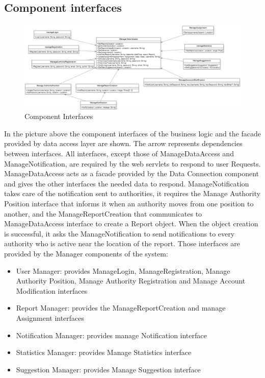 \subsection{Component interfaces}
\begin{figure}[H]
\centering
\includegraphics[width=\textwidth]{Images/Interfaces.png}
\caption{\label{fig:ComWI}Component Interfaces}
\end{figure}
In the picture above the component interfaces of the business logic and the facade provided by data access layer are shown. The arrow represents dependencies between interfaces. All interfaces, except those of ManageDataAccess and ManageNotification, are required by the web servlets to respond to user Requests. ManageDataAccess acts as a facade provided by the Data Connection component and gives the other interfaces the needed data to respond. ManageNotification takes care of the notification sent to authorities, it requires the Manage Authority Position interface that informs it when an authority moves from one position to another, and the ManageReportCreation that communicates to ManageDataAccess interface to create a Report object. When the object creation is successful, it asks the ManageNotification to send notifications to every authority who is active near the location of the report. Those interfaces are provided by the Manager components of the system:
\begin{itemize}
\item User Manager: provides ManageLogin, ManageRegistration, Manage Authority Position, Manage
Authority Registration and Manage Account Modification interfaces
\item Report Manager: provides the ManageReportCreation and manage Assignment interfaces
\item Notification Manager: provides manage Notification interface
\item Statistics Manager: provides Manage Statistics interface
\item Suggestion Manager: provides Manage Suggestion interface
\end{itemize}
